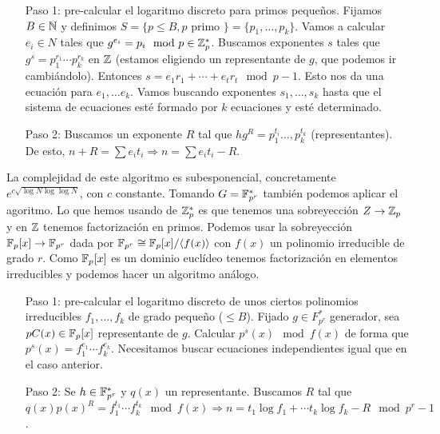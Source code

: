 \documentclass[CR.tex]{subfiles}
\begin{document}
\begin{enumerate}
\item[Paso 1:] pre-calcular el logaritmo discreto para primos pequeños. Fijamos $B\in\mathbb{N}$ y definimos $S=\{p\leq B, p\text{ primo }\}=\{p_1,\dots, p_k\}$. Vamos a calcular $e_i\in N$ tales que $g^{e_i}=p_i\mod p\in\mathbb{Z}_p^*$. Buscamos exponentes $s$ tales que $g^s=p_1^{r_1}\cdots p_k^{r_k}$ en $\mathbb{Z}$ (estamos eligiendo un representante de $g$, que podemos ir cambiándolo). Entonces $s=e_1r_1+\cdots+e_tr_t\mod p-1$. Esto nos da una ecuación para $e_1,\dots e_k$. Vamos buscando exponentes $s_1,\dots, s_k$  hasta que el sistema de ecuaciones esté formado por $k$ ecuaciones y esté determinado.
\item[Paso 2:] Buscamos un exponente $R$ tal que $hg^R=p_1^{t_i}\dots, p_k^{t_k}$ (representantes). De esto, $n+R=\sum e_it_i\Rightarrow n=\sum e_it_i-R$. 
\end{enumerate}

La complejidad de este algoritmo es subesponencial, concretamente $e^{c\sqrt{\log N\log\log N}}$, con $c$ constante. Tomando $G=\mathbb{F}_{p^r}^*$ también podemos aplicar el agoritmo. Lo que hemos usando de $\mathbb{Z}_p^*$ es que tenemos una sobreyección $Z\to \mathbb{Z}_p$ y en $\mathbb{Z}$ tenemos factorización en primos. Podemos usar la sobreyección $\mathbb{F}_p[x]\to \mathbb{F}_{p^r}$ dada por $\mathbb{F}_{p^r}\cong \mathbb{F}_p[x]/\langle{f(x)}\rangle$ con $f(x)$ un polinomio irreducible de grado $r$. Como $\mathbb{F}_p[x]$ es un dominio euclídeo tenemos factorización en elementos irreducibles y podemos hacer un algoritmo análogo.

\begin{enumerate}
\item[Paso 1:] pre-calcular el logaritmo discreto de unos ciertos polinomios irreducibles $f_1,\dots, f_k$ de grado pequeño ($\leq B$). Fijado $g\in F_{p^r}^*$ generador, sea $pC(x)\in\mathbb{F}_p[x]$ representante de $g$. Calcular $p^s(x)\mod f(x)$ de forma que $p^s(x)=f_1^{e_1}\cdots f_k^{e_k}$. Necesitamos buscar ecuaciones independientes igual que en el caso anterior.
\item[Paso 2:] Se $h\in\mathbb{F}_{p^r}^*$ y $q(x)$ un representante. Buscamos $R$ tal que  $q(x)p(x)^R=f_1^{t_1}\cdots f_k^{t_k}\mod f(x)\Rightarrow n=t_1\log f_1+\cdots t_k\log f_k-R\mod p^r-1$. 
\end{enumerate} 
\end{document}
